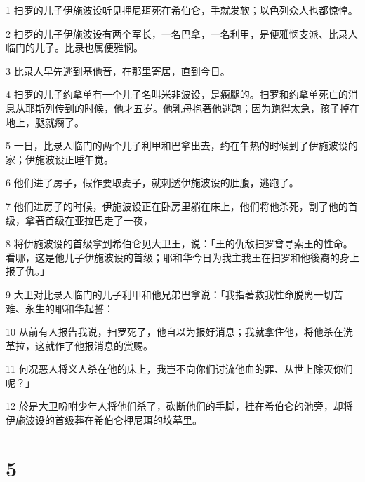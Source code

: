 \par 1 扫罗的儿子伊施波设听见押尼珥死在希伯仑，手就发软；以色列众人也都惊惶。
\par 2 扫罗的儿子伊施波设有两个军长，一名巴拿，一名利甲，是便雅悯支派、比录人临门的儿子。比录也属便雅悯。
\par 3 比录人早先逃到基他音，在那里寄居，直到今日。
\par 4 扫罗的儿子约拿单有一个儿子名叫米非波设，是瘸腿的。扫罗和约拿单死亡的消息从耶斯列传到的时候，他才五岁。他乳母抱著他逃跑；因为跑得太急，孩子掉在地上，腿就瘸了。
\par 5 一日，比录人临门的两个儿子利甲和巴拿出去，约在午热的时候到了伊施波设的家；伊施波设正睡午觉。
\par 6 他们进了房子，假作要取麦子，就刺透伊施波设的肚腹，逃跑了。
\par 7 他们进房子的时候，伊施波设正在卧房里躺在床上，他们将他杀死，割了他的首级，拿著首级在亚拉巴走了一夜，
\par 8 将伊施波设的首级拿到希伯仑见大卫王，说：「王的仇敌扫罗曾寻索王的性命。看哪，这是他儿子伊施波设的首级；耶和华今日为我主我王在扫罗和他後裔的身上报了仇。」
\par 9 大卫对比录人临门的儿子利甲和他兄弟巴拿说：「我指著救我性命脱离一切苦难、永生的耶和华起誓：
\par 10 从前有人报告我说，扫罗死了，他自以为报好消息；我就拿住他，将他杀在洗革拉，这就作了他报消息的赏赐。
\par 11 何况恶人将义人杀在他的床上，我岂不向你们讨流他血的罪、从世上除灭你们呢？」
\par 12 於是大卫吩咐少年人将他们杀了，砍断他们的手脚，挂在希伯仑的池旁，却将伊施波设的首级葬在希伯仑押尼珥的坟墓里。

\chapter{5}

